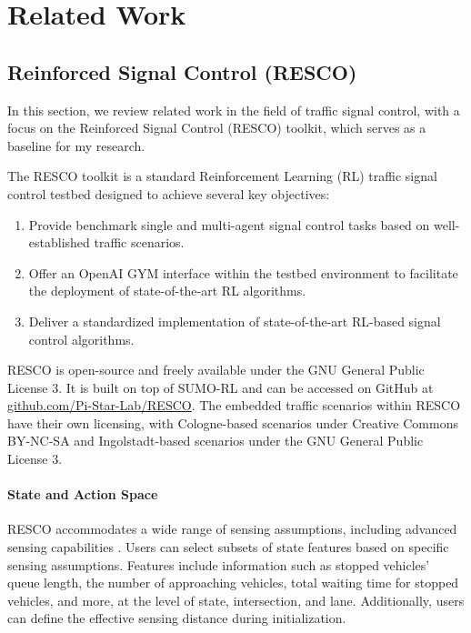 \chapter{Related Work}
\section{Reinforced Signal Control (RESCO)}
In this section, we review related work in the field of traffic signal control, with a focus on the Reinforced Signal Control (RESCO) toolkit, which serves as a baseline for my research.

The RESCO toolkit is a standard Reinforcement Learning (RL) traffic signal control testbed designed to achieve several key objectives:

\begin{enumerate}
    \item Provide benchmark single and multi-agent signal control tasks based on well-established traffic scenarios.
    \item Offer an OpenAI GYM interface within the testbed environment to facilitate the deployment of state-of-the-art RL algorithms.
    \item Deliver a standardized implementation of state-of-the-art RL-based signal control algorithms.
\end{enumerate}

RESCO is open-source and freely available under the GNU General Public License 3. It is built on top of SUMO-RL \cite{alegre2019sumo-rl} and can be accessed on GitHub at \url{github.com/Pi-Star-Lab/RESCO}. The embedded traffic scenarios within RESCO have their own licensing, with Cologne-based scenarios under Creative Commons BY-NC-SA and Ingolstadt-based scenarios under the GNU General Public License 3.

\subsubsection{State and Action Space}

RESCO accommodates a wide range of sensing assumptions, including advanced sensing capabilities \cite{codeca2018monaco}. Users can select subsets of state features based on specific sensing assumptions. Features include information such as stopped vehicles' queue length, the number of approaching vehicles, total waiting time for stopped vehicles, and more, at the level of state, intersection, and lane. Additionally, users can define the effective sensing distance during initialization.

